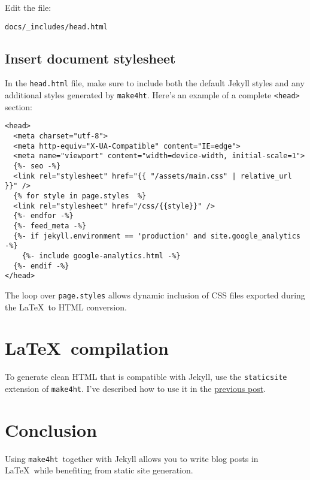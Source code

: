 \documentclass{article}
\def\makeht{\texttt{make4ht}}
\begin{document}
Edit the file:

\begin{verbatim}
docs/_includes/head.html
\end{verbatim}

\subsection{Insert document stylesheet}

In the \texttt{head.html} file, make sure to include both the default Jekyll styles
and any additional styles generated by \makeht. Here's an example of a complete \texttt{<head>} section:

\begin{verbatim}
<head>
  <meta charset="utf-8">
  <meta http-equiv="X-UA-Compatible" content="IE=edge">
  <meta name="viewport" content="width=device-width, initial-scale=1">
  {%- seo -%}
  <link rel="stylesheet" href="{{ "/assets/main.css" | relative_url }}" />
  {% for style in page.styles  %}
  <link rel="stylesheet" href="/css/{{style}}" />
  {%- endfor -%}
  {%- feed_meta -%}
  {%- if jekyll.environment == 'production' and site.google_analytics -%}
    {%- include google-analytics.html -%}
  {%- endif -%}
</head>
\end{verbatim}

The loop over \texttt{page.styles} allows dynamic inclusion of CSS files 
exported during the \LaTeX\ to HTML conversion.

\section{\LaTeX\ compilation}

To generate clean HTML that is compatible with Jekyll, 
use the \texttt{staticsite} extension of \makeht. I've described
how to use it in the \href{testblog/2021/07/30/how-to-blog-with-tex4ht.html}{previous post}.


\section{Conclusion}

Using \makeht\ together with Jekyll allows you to write blog posts in \LaTeX\ 
while benefiting from static site generation. 
\end{document}
